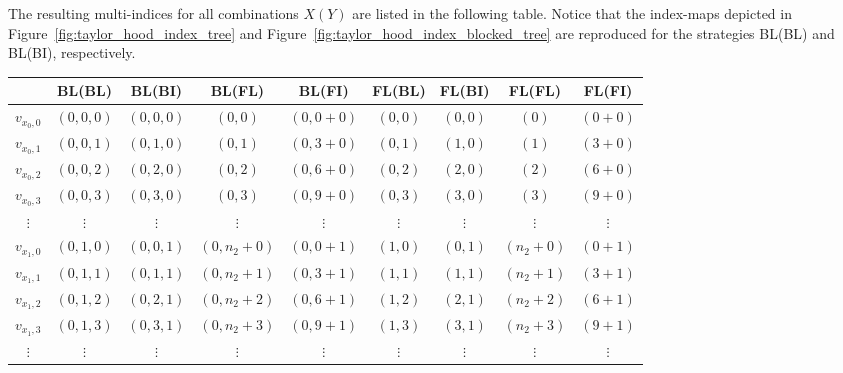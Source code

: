 \documentclass[a4paper,10pt,headings=normal,bibliography=totoc]{scrartcl}
\begin{document}
The resulting multi-indices for all combinations $X(Y)$ are listed
in the following table. Notice that the index-maps depicted in
Figure~\ref{fig:taylor_hood_index_tree} and Figure~\ref{fig:taylor_hood_index_blocked_tree}
are reproduced for the strategies
BL(BL) and BL(BI), respectively.

\begin{table}
\footnotesize
\begin{center}
\begin{tabular}{c|c|c|c|c|c|c|c|c}
    & BL(BL)
    & BL(BI)
    & BL(FL)
    & BL(FI)
    & FL(BL)
    & FL(BI)
    & FL(FL)
    & FL(FI)
    \\
  \hline
  $v_{x_0,0}$
    & $(0,0,0)$
    & $(0,0,0)$
    & $(0,0)$
    & $(0,0+0)$
    & $(0,0)$
    & $(0,0)$
    & $(0)$
    & $(0+0)$
    \\
  $v_{x_0,1}$
    & $(0,0,1)$
    & $(0,1,0)$
    & $(0,1)$
    & $(0,3+0)$
    & $(0,1)$
    & $(1,0)$
    & $(1)$
    & $(3+0)$
    \\
  $v_{x_0,2}$
    & $(0,0,2)$
    & $(0,2,0)$
    & $(0,2)$
    & $(0,6+0)$
    & $(0,2)$
    & $(2,0)$
    & $(2)$
    & $(6+0)$
    \\
  $v_{x_0,3}$
    & $(0,0,3)$
    & $(0,3,0)$
    & $(0,3)$
    & $(0,9+0)$
    & $(0,3)$
    & $(3,0)$
    & $(3)$
    & $(9+0)$
    \\
  $\vdots$ & $\vdots$ & $\vdots$ & $\vdots$ &  $\vdots$ & $\vdots$ & $\vdots$ & $\vdots$ & $\vdots$
  \\
  $v_{x_1,0}$
    & $(0,1,0)$
    & $(0,0,1)$
    & $(0,n_2+0)$
    & $(0,0+1)$
    & $(1,0)$
    & $(0,1)$
    & $(n_2+0)$
    & $(0+1)$
    \\
  $v_{x_1,1}$
    & $(0,1,1)$
    & $(0,1,1)$
    & $(0,n_2+1)$
    & $(0,3+1)$
    & $(1,1)$
    & $(1,1)$
    & $(n_2+1)$
    & $(3+1)$
    \\
  $v_{x_1,2}$
    & $(0,1,2)$
    & $(0,2,1)$
    & $(0,n_2+2)$
    & $(0,6+1)$
    & $(1,2)$
    & $(2,1)$
    & $(n_2+2)$
    & $(6+1)$
    \\
  $v_{x_1,3}$
    & $(0,1,3)$
    & $(0,3,1)$
    & $(0,n_2+3)$
    & $(0,9+1)$
    & $(1,3)$
    & $(3,1)$
    & $(n_2+3)$
    & $(9+1)$
    \\
  $\vdots$ & $\vdots$ & $\vdots$ & $\vdots$ &  $\vdots$ & $\vdots$ & $\vdots$ & $\vdots$ & $\vdots$

\end{tabular}
\end{center}
\end{table}
\end{document}
